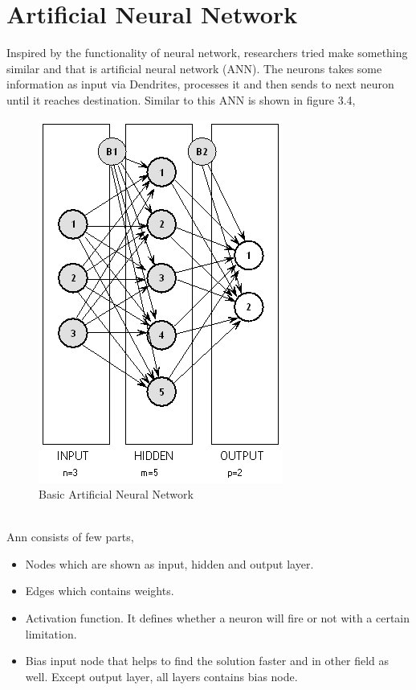 \documentclass{standalone}
\begin{document}
\section{Artificial Neural Network}

Inspired by the functionality of neural network, researchers tried make something similar and that is artificial neural network (ANN). The neurons takes some information as input via Dendrites, processes it and then sends to next neuron until it reaches destination. Similar to this ANN is shown in figure 3.4,
\\
\begin{figure}[h]
				\centering
				\includegraphics[scale=0.9]{./img/nn}
				\caption{Basic Artificial Neural Network} \label{fig:mapComp}
\end{figure}
\\
Ann consists of few parts, 
\begin{itemize}
  \item Nodes which are shown as input, hidden and output layer.
	\item Edges which contains weights.
	\item Activation function. It defines whether a neuron will fire or not with a certain limitation.
  \item Bias input node that helps to find the solution faster and in other field as well. Except output layer, all layers contains bias node.
\end{itemize}
\end{document}
